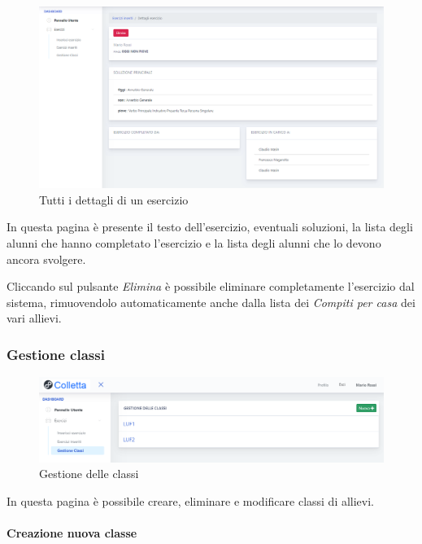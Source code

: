 \begin{figure}[H]
            	\centering
        		\includegraphics[width=17cm]{sez/img/insegnante/detagliesercizio.PNG} 
            	\caption{Tutti i dettagli di un esercizio}\label{fig:1}
        	\end{figure}     	
        	In questa pagina è presente il testo dell'esercizio, eventuali soluzioni, la lista degli alunni che hanno completato l'esercizio e la lista degli alunni che lo devono ancora svolgere.
        	
        	
        	Cliccando sul pulsante \textit{Elimina} è possibile eliminare completamente l'esercizio dal sistema, rimuovendolo automaticamente anche dalla lista dei \textit{Compiti per casa} dei vari allievi.
        	
\newpage
        \subsubsection{Gestione classi}   
       
        \begin{figure}[H]
            	\centering
        		\includegraphics[width=17cm]{sez/img/insegnante/elencoclassi.PNG} 
            	\caption{Gestione delle classi}\label{fig:1}
        	\end{figure}          	
        	   
        In questa pagina è possibile creare, eliminare e modificare classi di allievi. 

\paragraph{Creazione nuova classe}\mbox{}\\         

